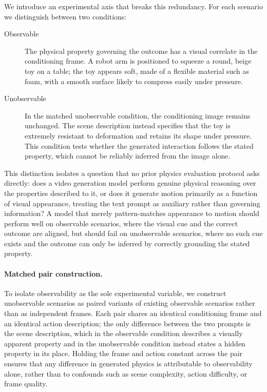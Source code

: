 \documentclass{article} %
\begin{document}
We introduce an experimental axis that breaks this redundancy. For each scenario we distinguish between two conditions:

\begin{description}
    \item[Observable] The physical property governing the outcome has a visual correlate in the conditioning frame. A robot arm is positioned to squeeze a round, beige toy on a table; the toy appears soft, made of a flexible material such as foam, with a smooth surface likely to compress easily under pressure.
    \item[Unobservable] In the matched unobservable condition, the conditioning image remains unchanged. The scene description instead specifies that the toy is extremely resistant to deformation and retains its shape under pressure. This condition tests whether the generated interaction follows the stated property, which cannot be reliably inferred from the image alone.
\end{description}

This distinction isolates a question that no prior physics evaluation protocol asks directly: does a video generation model perform genuine physical reasoning over the properties described to it, or does it generate motion primarily as a function of visual appearance, treating the text prompt as auxiliary rather than governing information? A model that merely pattern-matches appearance to motion should perform well on observable scenarios, where the visual cue and the correct outcome are aligned, but should fail on unobservable scenarios, where no such cue exists and the outcome can only be inferred by correctly grounding the stated property.

\paragraph{Matched pair construction.} To isolate observability as the sole experimental variable, we construct unobservable scenarios as paired variants of existing observable scenarios rather than as independent frames. Each pair shares an identical conditioning frame and an identical action description; the only difference between the two prompts is the scene description, which in the observable condition describes a visually apparent property and in the unobservable condition instead states a hidden property in its place. Holding the frame and action constant across the pair ensures that any difference in generated physics is attributable to observability alone, rather than to confounds such as scene complexity, action difficulty, or frame quality.
\end{document}
